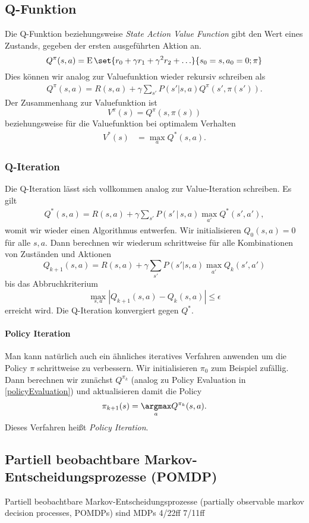 \subsection{Q-Funktion}
Die Q-Funktion beziehungsweise \emph{State Action Value Function} gibt den Wert eines Zustands, gegeben der ersten ausgeführten Aktion an.
\begin{equation*}
	Q^\pi(s,a)=\E\set{r_0+\gamma r_1+\gamma^2 r_2+\ldots}{s_0=s,a_0=0;\pi}
\end{equation*}
Dies können wir analog zur Valuefunktion wieder rekursiv schreiben als
\begin{align*}
	Q^\pi(s,a)=R(s,a)+\gamma\sum_{s'}P(s'|s,a)Q^\pi(s',\pi(s')).
\end{align*}
Der Zusammenhang zur Valuefunktion ist
\begin{equation*}
	V^\pi(s)=Q^\pi(s,\pi(s))
\end{equation*}
beziehungsweise für die Valuefunktion bei optimalem Verhalten
\begin{align*}
	V^\ast(s)&=\max_aQ^\ast(s,a).
\end{align*}

\subsubsection{Q-Iteration}
Die Q-Iteration lässt sich vollkommen analog zur Value-Iteration schreiben. Es gilt 
\begin{align*}
	Q^\ast(s,a)=R(s,a)+\gamma\sum_{s'}P(s'\,|\,s,a)\max_{a'}Q^\ast (s',a'),
\end{align*}
womit wir wieder einen Algorithmus entwerfen.
Wir initialisieren $Q_0(s,a)=0$ für alle $s,a$.
Dann berechnen wir wiederum schrittweise für alle Kombinationen von Zuständen und Aktionen
\begin{equation*}
	Q_{k+1}(s,a)=R(s,a)+\gamma\sum_{s'}P(s'|s,a)\max_{a'}Q_{k}(s',a')
\end{equation*}
bis das Abbruchkriterium 
\begin{equation*}
	\max_{s,a}|Q_{k+1}(s,a)-Q_k(s,a)|\leq \epsilon
\end{equation*}
erreicht wird.
Die Q-Iteration konvergiert gegen $Q^\ast$.

\paragraph{Policy Iteration}
Man kann natürlich auch ein ähnliches iteratives Verfahren anwenden um die Policy $\pi$ schrittweise zu verbessern.
Wir initialisieren $\pi_0$ zum Beispiel zufällig.
Dann berechnen wir zunächst $Q^{\pi_k}$ (analog zu Policy Evaluation in \autoref{policyEvaluation}) und aktualisieren damit die Policy
\begin{equation*}
	\pi_{k+1}(s)=\underset a\argmax Q^{\pi_k}(s,a).
\end{equation*}
Dieses Verfahren heißt \emph{Policy Iteration}.




\subsection{Partiell beobachtbare Markov-Entscheidungsprozesse (POMDP)}
Partiell beobachtbare Markov-Entscheidungsprozesse (partially observable markov decision processes, POMDPs) sind MDPs
4/22ff
7/11ff




